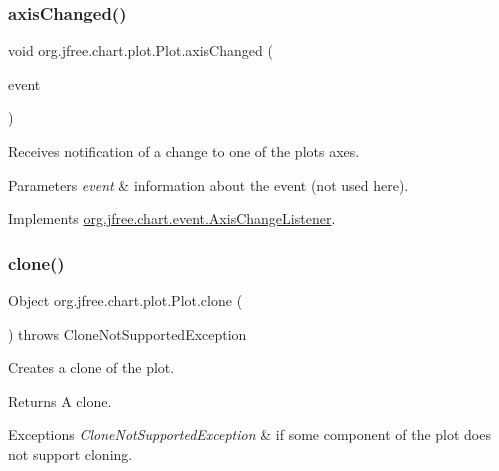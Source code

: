 \subsubsection{\texorpdfstring{axis\+Changed()}{axisChanged()}}
{\footnotesize\ttfamily void org.\+jfree.\+chart.\+plot.\+Plot.\+axis\+Changed (\begin{DoxyParamCaption}\item[{\mbox{\hyperlink{classorg_1_1jfree_1_1chart_1_1event_1_1_axis_change_event}{Axis\+Change\+Event}}}]{event }\end{DoxyParamCaption})}

Receives notification of a change to one of the plot\textquotesingle{}s axes.


\begin{DoxyParams}{Parameters}
{\em event} & information about the event (not used here). \\
\hline
\end{DoxyParams}


Implements \mbox{\hyperlink{interfaceorg_1_1jfree_1_1chart_1_1event_1_1_axis_change_listener_a0598d6b49c0ec1aff38fe39d34297b87}{org.\+jfree.\+chart.\+event.\+Axis\+Change\+Listener}}.

\mbox{\label{classorg_1_1jfree_1_1chart_1_1plot_1_1_plot_ad62a9d38e405c0febc86607c677f79c7}} 
\subsubsection{\texorpdfstring{clone()}{clone()}}
{\footnotesize\ttfamily Object org.\+jfree.\+chart.\+plot.\+Plot.\+clone (\begin{DoxyParamCaption}{ }\end{DoxyParamCaption}) throws Clone\+Not\+Supported\+Exception}

Creates a clone of the plot.

\begin{DoxyReturn}{Returns}
A clone.
\end{DoxyReturn}

\begin{DoxyExceptions}{Exceptions}
{\em Clone\+Not\+Supported\+Exception} & if some component of the plot does not support cloning. \\
\hline
\end{DoxyExceptions}
\mbox{\label{classorg_1_1jfree_1_1chart_1_1plot_1_1_plot_adf00363830c96a02ffb94ea3ae785cc8}} 
